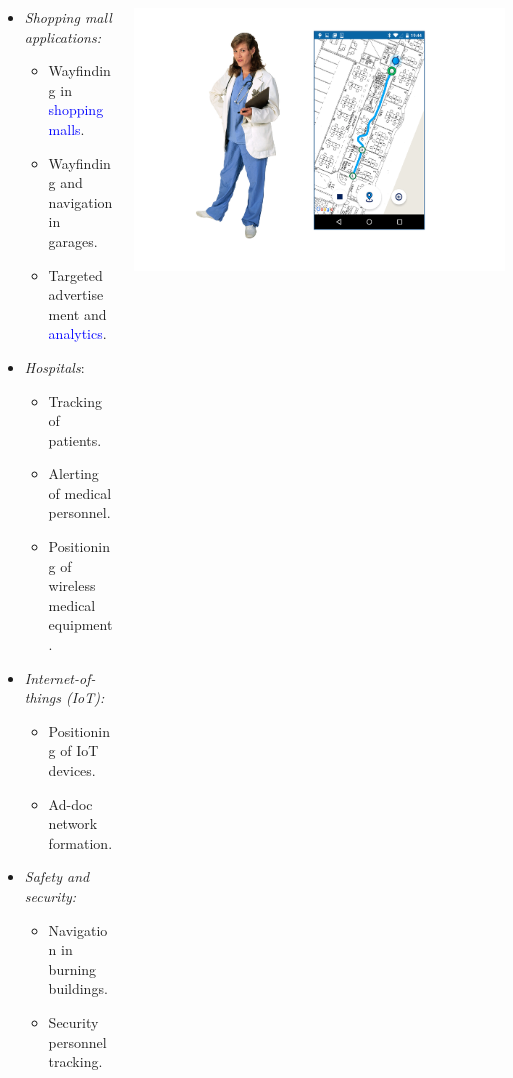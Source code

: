 \documentclass[xcolor=svgnames,english,handout]{beamer}
\newcommand{\balert}[1]{\textcolor{blue}{#1}}
\begin{document}
\begin{frame}
\begin{columns}
\begin{column}{0.7\textwidth}
\begin{itemize}[<+->]
  \item {\em Shopping mall applications:}
    \begin{itemize}[<+->]  
  	\item \alert{Wayfinding} in \balert{shopping malls}.
	\item Wayfinding and navigation in \alert{garages}.
  	\item Targeted \alert{advertisement} and \balert{analytics}.
    \end{itemize}
  \item {\em Hospitals}:
    \begin{itemize}[<+->]  
      \item Tracking of \alert{patients}.
      \item Alerting of \alert{medical personnel}. 
      \item Positioning of \alert{wireless medical equipment}. 
    \end{itemize}
  \item {\em Internet-of-things (IoT):}
    \begin{itemize}[<+->]    
      \item Positioning of \alert{IoT devices}.
      \item \alert{Ad-doc network} formation.
    \end{itemize}
  \item {\em Safety and security:}
    \begin{itemize}[<+->]    
      \item Navigation in \alert{burning buildings}.
      \item \alert{Security personnel} tracking.
    \end{itemize}
  \end{itemize}
  \end{column}
  \begin{column}{0.3\textwidth}
  \includegraphics[width=0.8\columnwidth]{nurse_nav} \\

\end{column}
\end{columns}
\end{frame}
\end{document}
